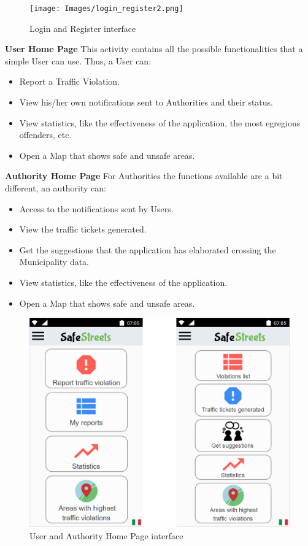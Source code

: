     \begin{figure}[h]
        \centering
        \texttt{[image: Images/login\_register2.png]}
        \caption{Login and Register interface}
    \end{figure}
    \noindent\textbf{User Home Page}\newline
    This activity contains all the possible functionalities that a simple User can use. Thus, a User can:
    \begin{itemize}
        \item Report a Traffic Violation.
        \item View his/her own notifications sent to Authorities and their status.
        \item View statistics, like the effectiveness of the application, the most egregious offenders, etc.
        \item Open a Map that shows safe and unsafe areas.
    \end{itemize}
    \textbf{Authority Home Page}\newline
    For Authorities the functions available are a bit different, an authority can:
    \begin{itemize}
        \item Access to the notifications sent by Users.
        \item View the traffic tickets generated.
        \item Get the suggestions that the application has elaborated crossing the Municipality data.
        \item View statistics, like the effectiveness of the application.
        \item Open a Map that shows safe and unsafe areas.
    \end{itemize}
    
    \begin{figure}[h]
    \centering
    \includegraphics[scale=0.5]{Images/user_authority_menu.png}
    \caption{User and Authority Home Page interface}
    \end{figure}
    
